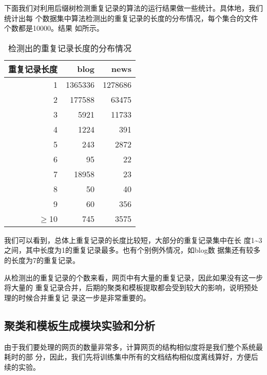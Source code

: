 下面我们对利用后缀树检测重复记录的算法的运行结果做一些统计。具体地，我们统计出每
个数据集中算法检测出的重复记录的长度的分布情况，每个集合的文件个数都是10000。结果
如所示。
\begin{table}[h]
  \centering
  \caption{检测出的重复记录长度的分布情况\label{experiment:tab:recordlength}}
\begin{tabular}{rrr}
  \toprule
重复记录长度 & blog & news \\
\hline
1 & 1365336 & 1278686 \\
2 & 177588 & 63475 \\
3 & 5921 & 11733 \\
4 & 1224 & 391 \\
5 & 243 & 2872 \\
6 & 95 & 22 \\
7 & 18958 & 23 \\
8 & 50 & 40 \\
9 & 60 & 356 \\
$\ge$10 & 745 & 3575 \\
\bottomrule
\end{tabular}
\end{table}
\begin{comment}
#+ORGTBL: SEND recordlength orgtbl-to-latex :splice nil :skip 0
| 重复记录长度 |    blog |    news |
|--------------+---------+---------|
|            1 | 1365336 | 1278686 |
|            2 |  177588 |   63475 |
|            3 |    5921 |   11733 |
|            4 |    1224 |     391 |
|            5 |     243 |    2872 |
|            6 |      95 |      22 |
|            7 |   18958 |      23 |
|            8 |      50 |      40 |
|            9 |      60 |     356 |
|       $>=$10 |     745 |    3575 |
\end{comment}


我们可以看到，总体上重复记录的长度比较短，大部分的重复记录集中在长
度1\textasciitilde{}3之间，其中长度为1的重复记录最多。也有个别例外情况，如blog数
据集还有较多的长度为7的重复记录。

从检测出的重复记录的个数来看，网页中有大量的重复记录，因此如果没有这一步将大量的
重复记录合并，后期的聚类和模板提取都会受到较大的影响，说明预处理的时候合并重复记
录这一步是非常重要的。
\subsection{聚类和模板生成模块实验和分析}
由于我们要处理的网页的数量非常多，计算网页的结构相似度将是我们整个系统最耗时的部
分，因此，我们先将训练集中所有的文档结构相似度离线算好，方便后续的实验。

